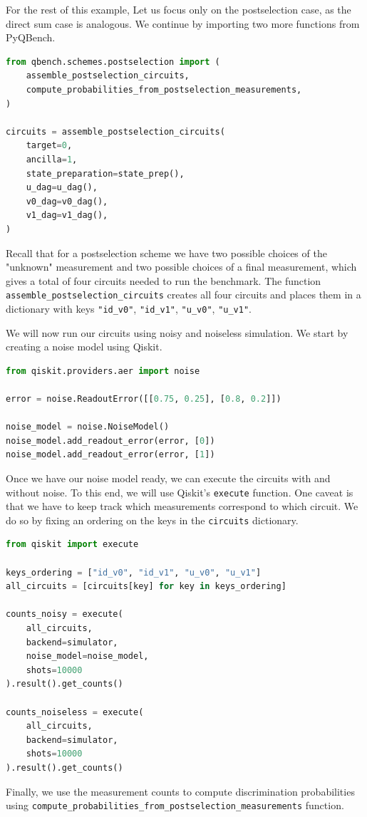 \documentclass[preprint,12pt, a4paper, dvipsnames]{elsarticle}
\newcommand{\1}{{\rm 1\hspace{-0.9mm}l}}
\theoremstyle{definition}
\begin{document}
\pagebreak

For the rest of this example, Let us focus only on the postselection case, as the direct sum case is
analogous. We continue by importing two more functions from PyQBench.
\begin{lstlisting}[language=Python, caption= Assembling circuits]
from qbench.schemes.postselection import (
    assemble_postselection_circuits,
    compute_probabilities_from_postselection_measurements,
)

circuits = assemble_postselection_circuits(
	target=0,
	ancilla=1,
	state_preparation=state_prep(),
	u_dag=u_dag(),
	v0_dag=v0_dag(),
	v1_dag=v1_dag(),
)

\end{lstlisting}
Recall that for a postselection scheme we have two possible choices of the "unknown" measurement and
two possible choices of a final measurement, which gives a total of four circuits needed to run the
benchmark. The function \texttt{assemble\_postselection\_circuits} creates all four circuits and
places them in a dictionary with keys \texttt{"id\_v0"}, \texttt{"id\_v1"}, \texttt{"u\_v0"},
\texttt{"u\_v1"}.

We will now run our circuits using noisy and noiseless simulation. We start by creating a noise
model using Qiskit.


\begin{lstlisting}[language=Python, caption=Adding noise model]
from qiskit.providers.aer import noise

error = noise.ReadoutError([[0.75, 0.25], [0.8, 0.2]])

noise_model = noise.NoiseModel()
noise_model.add_readout_error(error, [0])
noise_model.add_readout_error(error, [1])
\end{lstlisting}
Once we have our noise model ready, we can execute the circuits with and without noise. To this end,
we will use Qiskit’s \texttt{execute} function. One caveat is that we have to keep track which
measurements correspond to which circuit. We do so by fixing an ordering on the keys in the \texttt{circuits} dictionary.
\begin{lstlisting}[language=Python, caption=Running  circuits]
from qiskit import execute

keys_ordering = ["id_v0", "id_v1", "u_v0", "u_v1"]
all_circuits = [circuits[key] for key in keys_ordering]

counts_noisy = execute(
	all_circuits,
	backend=simulator,
	noise_model=noise_model,
	shots=10000
).result().get_counts()

counts_noiseless = execute(
	all_circuits,
	backend=simulator,
	shots=10000
).result().get_counts()
\end{lstlisting}
Finally, we use the measurement counts to compute discrimination probabilities using \texttt{compute\_probabilities\_from\_postselection\_measurements} function.
\end{document}

